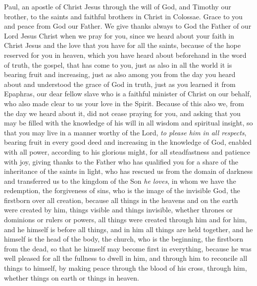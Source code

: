 
\begin{biblechapter} %
 Paul, an apostle of Christ Jesus through the will of God, and Timothy our brother,
\verse to the saints and faithful brothers in Christ in Colossae. Grace to you and peace from God our Father.
 We give thanks always to God the Father of our Lord Jesus Christ when we pray for you,
\verse since we heard about your faith in Christ Jesus and the love that you have for all the saints,
\verse because of the hope reserved for you in heaven, which you have heard about beforehand in the word of truth, the gospel,
\verse that has come to you, just as also in all the world it is bearing fruit and increasing, just as also among you from the day you heard about and understood the grace of God in truth,
\verse just as you learned it from Epaphras, our dear fellow slave who is a faithful minister of Christ on our behalf,
\verse who also made clear to us your love in the Spirit.
 Because of this also we, from the day we heard about it, did not cease praying for you, and asking that you may be filled with the knowledge of his will in all wisdom and spiritual insight,
\verse so that you may live in a manner worthy of the Lord, \textit{to please him in all respects}, bearing fruit in every good deed and increasing in the knowledge of God,
\verse enabled with all power, according to his glorious might, for all steadfastness and patience with joy,
\verse giving thanks to the Father who has qualified you for a share of the inheritance of the saints in light,
\verse who has rescued us from the domain of darkness and transferred us to the kingdom of the Son \textit{he loves},
\verse in whom we have the redemption, the forgiveness of sins,
\verse who is the image of the invisible God, the firstborn over all creation,
\verse because all things in the heavens and on the earth were created by him, things visible and things invisible, whether thrones or dominions or rulers or powers, all things were created through him and for him,
\verse and he himself is before all things, and in him all things are held together,
\verse and he himself is the head of the body, the church, who is the beginning, the firstborn from the dead, so that he himself may become first in everything,
\verse because he was well pleased for all the fullness to dwell in him,
\verse and through him to reconcile all things to himself, by making peace through the blood of his cross, through him, whether things on earth or things in heaven.

\end{biblechapter}
